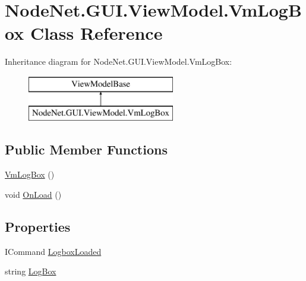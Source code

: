 \hypertarget{class_node_net_1_1_g_u_i_1_1_view_model_1_1_vm_log_box}{}\section{Node\+Net.\+G\+U\+I.\+View\+Model.\+Vm\+Log\+Box Class Reference}
\label{class_node_net_1_1_g_u_i_1_1_view_model_1_1_vm_log_box}
Inheritance diagram for Node\+Net.\+G\+U\+I.\+View\+Model.\+Vm\+Log\+Box\+:\begin{figure}[H]
\begin{center}
\leavevmode
\includegraphics[height=2.000000cm]{class_node_net_1_1_g_u_i_1_1_view_model_1_1_vm_log_box}
\end{center}
\end{figure}
\subsection*{Public Member Functions}
\begin{DoxyCompactItemize}
\item 
\hyperlink{class_node_net_1_1_g_u_i_1_1_view_model_1_1_vm_log_box_acb885a15a83c1bc1294c464651cd512e}{Vm\+Log\+Box} ()
\item 
void \hyperlink{class_node_net_1_1_g_u_i_1_1_view_model_1_1_vm_log_box_a618d6ea5d41f6d9f205e970d85e375d1}{On\+Load} ()
\end{DoxyCompactItemize}
\subsection*{Properties}
\begin{DoxyCompactItemize}
\item 
I\+Command \hyperlink{class_node_net_1_1_g_u_i_1_1_view_model_1_1_vm_log_box_a0bb3ce310afc07ace0eb55680f5708ef}{Logbox\+Loaded}
\item 
string \hyperlink{class_node_net_1_1_g_u_i_1_1_view_model_1_1_vm_log_box_a0c428e26c47ea4d03e3bbb72a535d259}{Log\+Box}
\end{DoxyCompactItemize}


